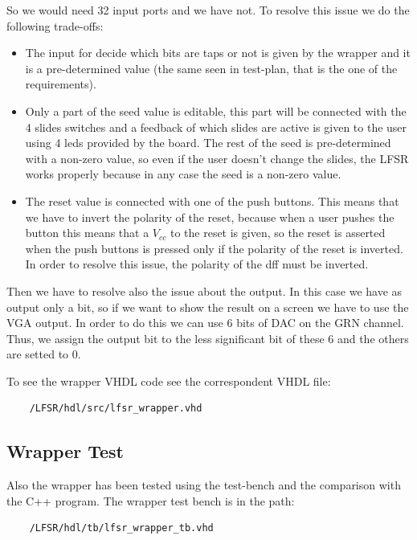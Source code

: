 \documentclass[a4paper]{report}
\begin{document}
\noindent So we would need 32 input ports and we have not. To resolve this issue we do the following trade-offs:
\begin{itemize}
	\item The input for decide which bits are taps or not is given by the wrapper and it is a pre-determined value (the same seen in test-plan, that is the one of the requirements).
	\item Only a part of the seed value is editable, this part will be connected with the 4 slides switches and a feedback of which slides are active is given to the user using 4 leds provided by the board. The rest of the seed is pre-determined with a non-zero value, so even if the user doesn't change the slides, the LFSR works properly because in any case the seed is a non-zero value.
	\item The reset value is connected with one of the push buttons. This means that we have to invert the polarity of the reset, because when a user pushes the button this means that a $V_{cc}$ to the reset is given, so the reset is asserted when the push buttons is pressed only if the polarity of the reset is inverted. In order to resolve this issue, the polarity of the dff must be inverted.
\end{itemize}

\noindent Then we have to resolve also the issue about the output. In this case we have as output only a bit, so if we want to show the result on a screen we have to use the VGA output. In order to do this we can use 6 bits of DAC on the GRN channel. Thus, we assign the output bit to the less significant bit of these 6 and the others are setted to 0.

\noindent To see the wrapper VHDL code see the correspondent VHDL file:
\begin{Verbatim}
	/LFSR/hdl/src/lfsr_wrapper.vhd
\end{Verbatim}

\subsection{Wrapper Test}
\noindent Also the wrapper has been tested using the test-bench and the comparison with the C++ program. The wrapper test bench is in the path:
\begin{Verbatim}
	/LFSR/hdl/tb/lfsr_wrapper_tb.vhd
\end{Verbatim}
\end{document}
